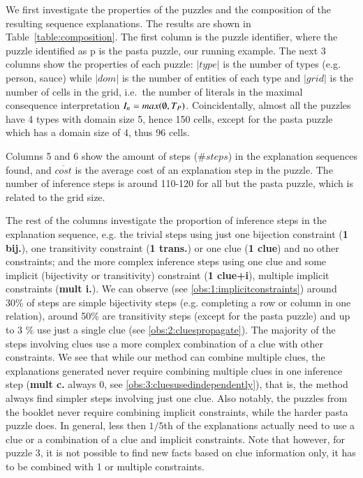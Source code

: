 We first investigate the properties of the puzzles and the composition of the resulting sequence explanations. The results are shown in Table~\ref{table:composition}. The first column is the puzzle identifier, where the puzzle identified as p is the pasta puzzle, our running example. 
The next 3 columns show the properties of each puzzle:
$|type|$ is the number of types (e.g. person, sauce) while $|dom|$ is the number of entities of each type and $|grid|$ is the number of cells in the grid, i.e.\ the number of literals in the maximal consequence interpretation $I_n=max(\emptyset, T_P)$.
Coincidentally, almost all the puzzles have 4 types with domain size 5,  hence 150 cells, except for the pasta puzzle which has a domain size of 4, thus 96 cells.

Columns 5 and 6 show the amount of steps ($\# steps$) in the explanation sequences found, and $\overline{cost}$ is the average cost of an explanation step in the puzzle. The number of inference steps is around 110-120 for all but the pasta puzzle, which is related to the grid size.

The rest of the columns investigate the proportion of inference steps in the explanation sequence, e.g. the trivial steps using just one bijection constraint (\textbf{1 bij.}), one transitivity constraint (\textbf{1 trans.}) or one clue (\textbf{1 clue}) and no other constraints; and the more complex inference steps using one clue and some implicit (bijectivity or transitivity) constraint (\textbf{1 clue+i}), multiple implicit constraints (\textbf{mult i.}). 
We can observe (see \ref{obs:1:implicitconstraints}) around 30\% of steps are simple bijectivity steps (e.g. completing a row or column in one relation), around 50\% are transitivity steps (except for the pasta puzzle) and up to 3 \% use just a single clue (see \ref{obs:2:cluespropagate}). 
The majority of the steps involving clues use a more complex combination of a clue with other constraints. 
We see that while our method can combine multiple clues, the explanations generated never require combining multiple clues in one inference step (\textbf{mult c.} always 0, see \ref{obs:3:cluesusedindependently}), that is, the method always find simpler steps involving just one clue. 
Also notably, the puzzles from the booklet never require combining implicit constraints, while the harder pasta puzzle does. 
In general, less then $1/5$th of the explanations actually need to use a clue or a combination of a clue and implicit constraints.
Note that however, for puzzle 3, it is not possible to find new facts based on clue information only, it has to be combined with 1 or multiple constraints.

